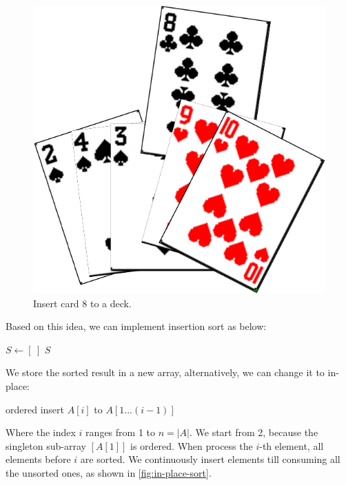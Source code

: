 \documentclass[b5paper]{article}
\begin{document}
\begin{figure}[htbp]
  \centering
  \includegraphics[scale=0.5]{img/card-deck}
  \caption{Insert card 8 to a deck.}
  \label{fig:hand-of-cards}
\end{figure}

Based on this idea, we can implement insertion sort as below:

\begin{algorithmic}[1]
  \State $S \gets [\ ]$
    \State {}
  \EndFor
  \State \Return $S$
\EndFunction
\end{algorithmic}

We store the sorted result in a new array, alternatively, we can change it to in-place:

\begin{algorithmic}[1]
    \State ordered insert $A[i]$ to $A[1...(i-1)]$
  \EndFor
\EndFunction
\end{algorithmic}

Where the index $i$ ranges from 1 to $n = |A|$. We start from 2, because the singleton sub-array $[A[1]]$ is ordered. When process the $i$-th element, all elements before $i$ are sorted. We continuously insert elements till consuming all the unsorted ones, as shown in \cref{fig:in-place-sort}.
\end{document}
